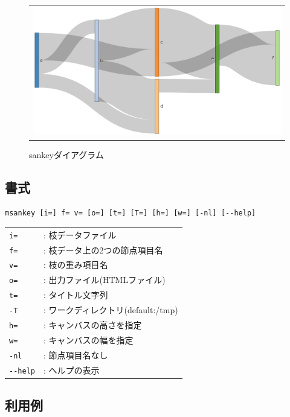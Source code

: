 \begin{figure}[htbp]
\begin{center}
\begin{tabular}{c}

\begin{minipage}{0.5\hsize}
\begin{center}
\includegraphics[scale=0.5]{figure/sankey1.eps}
\caption{sankeyダイアグラム\label{fig:sankey1}}
\end{center}
\end{minipage}

\end{tabular}
\end{center}
\end{figure}



\subsection{書式}
\begin{verbatim}
msankey [i=] f= v= [o=] [t=] [T=] [h=] [w=] [-nl] [--help] 
\end{verbatim}

\begin{table}[htbp]
{\small
\begin{tabular}{ll}
\verb|i=| & : 枝データファイル \\
\verb|f=| & : 枝データ上の2つの節点項目名 \\
\verb|v=| & : 枝の重み項目名 \\
\verb|o=| & : 出力ファイル(HTMLファイル) \\
\verb|t=| & : タイトル文字列 \\
\verb|-T| & : ワークディレクトリ(default:/tmp) \\
\verb|h=| & : キャンバスの高さを指定 \\
\verb|w=| & : キャンバスの幅を指定 \\
\verb|-nl| & : 節点項目名なし \\
\verb|--help| & : ヘルプの表示 \\
\end{tabular} 
}
\end{table} 

\subsection{利用例}


%
